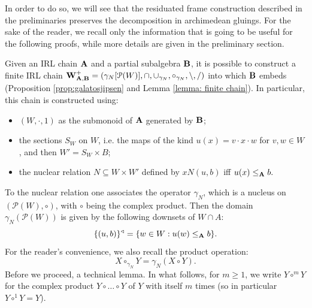 \documentclass{amsart}
\theoremstyle{definition}
\numberwithin{equation}{section}
\newcommand{\alg}[1]{{\textbf{\upshape #1}}}  %
\newcommand{\sse}{\subseteq}
\begin{document}
In order to do so, we will see that the residuated frame construction described in the preliminaries preserves the decomposition in archimedean gluings. For the sake of the reader, we recall only the information that is going to be useful for the following proofs, while more details are given in the preliminary section.

Given an IRL chain $\alg A$ and a partial subalgebra $\alg B$, it is possible to construct a finite IRL chain $\alg W_{\alg A, \alg B}^+ = (\gamma_N[\mathcal{P}(W)], \cap, \cup_{\gamma_N}, \circ_{\gamma_N}, \backslash, /)$ into which $\alg B$ embeds (Proposition \ref{prop:galatosjipsen} and Lemma \ref{lemma: finite chain}). In particular, this chain is constructed using: 
\begin{itemize}
	\item $(W, \cdot, 1)$ as the submonoid of $\alg A$ generated by $\alg B$; 
	\item the sections $S_W$ on $W$, i.e. the maps of the kind $u(x)=v \cdot x \cdot w$ for $v, w \in W$, and then $W' = S_W \times B$; 
	\item the nuclear relation $N \sse W \times W'$ defined by $x N (u,b)$ iff $u(x)\leq_{\alg A} b.$ 
\end{itemize}
To the nuclear relation one associates the operator $\gamma_N$, which is a nucleus on $(\mathcal{P}(W), \circ)$, with $\circ$ being the complex product. Then the domain $\gamma_N(\mathcal{P}(W))$ is given by the following downsets of $W \cap A$:
$$\{(u,b)\}^\triangleleft = \{w \in W : u(w)\leq_{\alg A} b\}.$$
For the reader's convenience, we also recall the product operation:
$$X\circ_{\gamma_N} Y = \gamma_N(X \circ Y).$$
Before we proceed, a technical lemma. In what follows, for $m \geq 1$, we write $Y \circ^m Y$ for the complex product $Y \circ \ldots \circ Y$ of $Y$ with itself $m$ times (so in particular $Y \circ^1 Y = Y$). 
 
\end{document}
